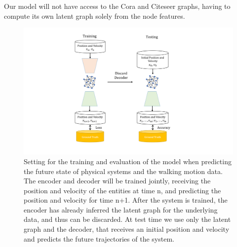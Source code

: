 \documentclass[12pt,a4paper]{article}
\begin{document}
	Our model will not have access to the Cora and Citeseer graphs, having to compute its own latent graph solely from the node features.

	\begin{figure}[hbtp]
		\includegraphics[width=\textwidth]{eval_part1_2.png}
		\caption{Setting for the training and evaluation of the model when predicting the future state of physical systems and the walking motion data. The encoder and decoder will be trained jointly, receiving the position and velocity of the entities at time n, and predicting the position and velocity for time n+1. After the system is trained, the encoder has already inferred the latent graph for the underlying data, and thus can be discarded. At test time we use only the latent graph and the decoder, that receives an initial position and velocity and predicts the future trajectories of the system. \label{eval1}}
	\end{figure}
\end{document}
